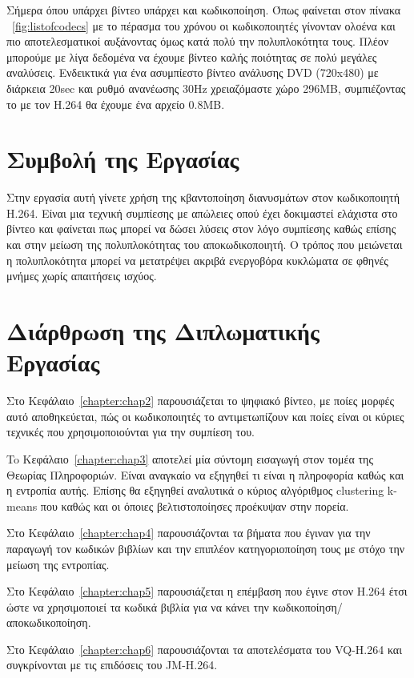 \indent
Σήμερα όπου υπάρχει βίντεο υπάρχει και κωδικοποίηση. Όπως φαίνεται στον πίνακα ~\ref{fig:listofcodecs} με το πέρασμα του χρόνου οι κωδικοποιητές γίνονταν ολοένα και πιο αποτελεσματικοί αυξάνοντας όμως κατά πολύ την πολυπλοκότητα τους. Πλέον μπορούμε με λίγα δεδομένα να έχουμε βίντεο καλής ποιότητας σε πολύ μεγάλες αναλύσεις. Ενδεικτικά για ένα ασυμπίεστο βίντεο ανάλυσης DVD (720x480) με διάρκεια 20sec και ρυθμό ανανέωσης \si{30}{Hz} χρειαζόμαστε χώρο 296ΜΒ, συμπιέζοντας το με τον H.264 θα έχουμε ένα αρχείο 0.8ΜΒ.

\section{Συμβολή της Εργασίας}
\label{section:sect12}
\indent
Στην εργασία αυτή γίνετε χρήση της κβαντοποίηση διανυσμάτων στον κωδικοποιητή H.264. Είναι μια τεχνική συμπίεσης με απώλειες οπού έχει δοκιμαστεί ελάχιστα στο βίντεο και φαίνεται πως μπορεί να δώσει λύσεις στον λόγο συμπίεσης καθώς επίσης και στην μείωση της πολυπλοκότητας του αποκωδικοποιητή. Ο τρόπος που μειώνεται η πολυπλοκότητα μπορεί να μετατρέψει ακριβά ενεργοβόρα κυκλώματα σε φθηνές μνήμες χωρίς απαιτήσεις ισχύος.

\section{Διάρθρωση της Διπλωματικής Εργασίας}
\label{section:sect13}

\indent
Στο Κεφάλαιο~\ref{chapter:chap2} παρουσιάζεται το ψηφιακό βίντεο, με ποίες μορφές αυτό αποθηκεύεται, πώς οι κωδικοποιητές το αντιμετωπίζουν και ποίες είναι οι κύριες τεχνικές που χρησιμοποιούνται για την συμπίεση του.\newline \indent

To Κεφάλαιο~\ref{chapter:chap3} αποτελεί μία σύντομη εισαγωγή στον τομέα της Θεωρίας Πληροφοριών. Είναι αναγκαίο να εξηγηθεί τι είναι η πληροφορία καθώς και η εντροπία αυτής. Επίσης θα εξηγηθεί αναλυτικά ο κύριος αλγόριθμος clustering k-means που καθώς και οι όποιες βελτιστοποίησες προέκυψαν στην πορεία.\newline \indent

Στο Κεφάλαιο~\ref{chapter:chap4} παρουσιάζονται τα βήματα που έγιναν για την παραγωγή τον κωδικών βιβλίων και την επιπλέον κατηγοριοποίηση τους με στόχο την μείωση της εντροπίας.\newline \indent

Στο Κεφάλαιο~\ref{chapter:chap5} παρουσιάζεται η επέμβαση που έγινε στον H.264 έτσι ώστε να χρησιμοποιεί τα κωδικά βιβλία για να κάνει την κωδικοποίηση/αποκωδικοποίηση.\newline \indent

Στο Κεφάλαιο~\ref{chapter:chap6} παρουσιάζονται τα αποτελέσματα του VQ-H.264 και συγκρίνονται με τις επιδόσεις του JM-H.264.